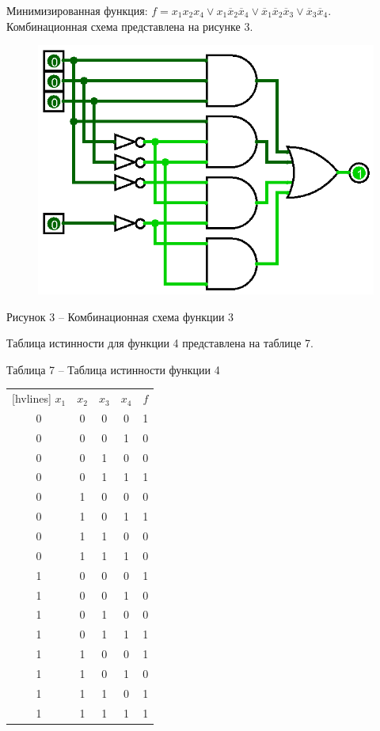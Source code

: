 \documentclass[a4paper,14pt]{extarticle}
\begin{document}
	Минимизированная функция: $f=x_1x_2x_4\lor x_1\overline{x}_2\overline{x}_4\lor \overline{x}_1\overline{x}_2\overline{x}_3\lor \overline{x}_3\overline{x}_4$. Комбинационная схема представлена на рисунке 3.
	
	\pagebreak
	\begin{figure}[h]
		\centering
		\includegraphics[width=0.5\linewidth]{images/s-1-3}
	\end{figure}
	\begin{center}
		Рисунок 3 – Комбинационная схема функции 3
	\end{center}
	
	Таблица истинности для функции 4 представлена на таблице 7.
	
	\noindent Таблица 7 -- Таблица истинности функции 4 \\
	\begin{NiceTabular}{ccccc}[hvlines]
		$x_1$ & $x_2$ & $x_3$ & $x_4$ & $f$ \\
		0 & 0 & 0 & 0 & 1 \\
		0 & 0 & 0 & 1 & 0 \\
		0 & 0 & 1 & 0 & 0 \\
		0 & 0 & 1 & 1 & 1 \\
		0 & 1 & 0 & 0 & 0 \\
		0 & 1 & 0 & 1 & 1 \\
		0 & 1 & 1 & 0 & 0 \\
		0 & 1 & 1 & 1 & 0 \\
		1 & 0 & 0 & 0 & 1 \\
		1 & 0 & 0 & 1 & 0 \\
		1 & 0 & 1 & 0 & 0 \\
		1 & 0 & 1 & 1 & 1 \\
		1 & 1 & 0 & 0 & 1 \\
		1 & 1 & 0 & 1 & 0 \\
		1 & 1 & 1 & 0 & 1 \\
		1 & 1 & 1 & 1 & 1
	\end{NiceTabular}\\
	
\end{document}
